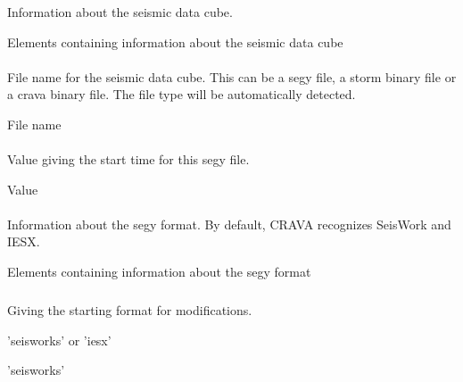 \subsubsection{\necessary}
 \slist
   \item \Description Information about the seismic data cube.
   \item \Argument Elements containing information about the seismic data cube
   \item \Default
 \elist

\paragraph{\necessary}
 \slist
   \item \Description File name for the seismic data cube. This can be
     a segy file, a storm binary file or a crava binary file. The file
     type will be automatically detected.
   \item \Argument File name
   \item \Default
 \elist

\paragraph{}
 \slist
   \item \Description Value giving the start time for this segy file.
   \item \Argument Value
   \item \Default
 \elist

\paragraph{}
 \slist
   \item \Description Information about the segy format. By default, CRAVA recognizes SeisWork and IESX.
   \item \Argument Elements containing information about the segy format
   \item \Default
 \elist

\subparagraph{}
 \slist
   \item \Description Giving the starting format for modifications.
   \item \Argument 'seisworks' or 'iesx'
   \item \Default 'seisworks'
 \elist

